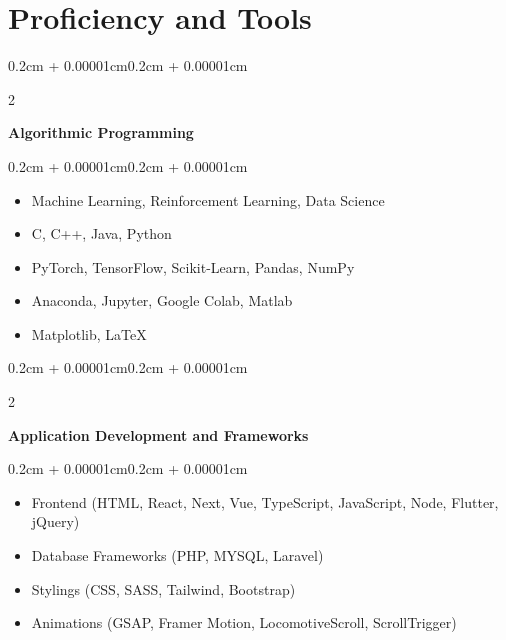 \documentclass[10pt, letterpaper]{article}
\newenvironment{highlights}{
    \begin{itemize}[
        topsep=0.10cm,
        parsep=0.10cm,
        partopsep=0pt,
        itemsep=0pt,
        leftmargin=0.4cm + 10pt
    ]
}{
    \end{itemize}
}
\newenvironment{onecolentry}{
    \begin{adjustwidth}{0.2cm + 0.00001cm}{0.2cm + 0.00001cm}
}{
    \end{adjustwidth}
}
\newenvironment{twocolentry}[2][]{
    \onecolentry
    \def\secondColumn{#2}
    \setcolumnwidth{\fill, 5.2cm}
    \begin{paracol}{2}
}{
    \switchcolumn \raggedleft \secondColumn
    \end{paracol}
    \endonecolentry
}
\newenvironment{projectentry}{
    \needspace{2.5\baselineskip}
}{
}
\newenvironment{firstprojectentry}{
    \needspace{2\baselineskip}
}{
}
\begin{document}
    \section{Proficiency and Tools}

    \begin{firstprojectentry}
    \begin{twocolentry}{
        \textit{}
    }
        \textbf{Algorithmic Programming}
    \end{twocolentry}
    \vspace{0.10cm}
    \begin{onecolentry}
        \begin{highlights}
            \item Machine Learning, Reinforcement Learning, Data Science
            \item C, C++, Java, Python
            \item PyTorch, TensorFlow, Scikit-Learn, Pandas, NumPy
            \item Anaconda, Jupyter, Google Colab, Matlab
            \item Matplotlib, LaTeX
        \end{highlights}
    \end{onecolentry}
    \end{firstprojectentry}

    \begin{projectentry}
    \begin{twocolentry}{
        \textit{}
    }
        \textbf{Application Development and Frameworks}
    \end{twocolentry}
    \vspace{0.10cm}
    \begin{onecolentry}
        \begin{highlights}
            \item Frontend (HTML, React, Next, Vue, TypeScript, JavaScript, Node, Flutter, jQuery)
            \item Database Frameworks (PHP, MYSQL, Laravel)
            \item Stylings (CSS, SASS, Tailwind, Bootstrap)
            \item Animations (GSAP, Framer Motion, LocomotiveScroll, ScrollTrigger)
        \end{highlights}
    \end{onecolentry}
    \end{projectentry}
\end{document}
